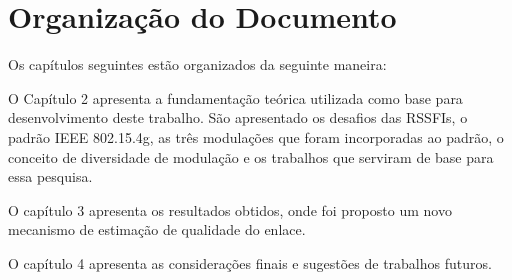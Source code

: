 \section{Organização do Documento}
\label{sec:organizacao}

Os capítulos seguintes estão organizados da seguinte maneira:

O Capítulo 2 apresenta a fundamentação teórica utilizada 
como base para desenvolvimento deste trabalho. São apresentado 
os desafios das RSSFIs, o padrão IEEE 802.15.4g, as três modulações que foram incorporadas ao padrão, o conceito de diversidade de modulação e os trabalhos que serviram de base para essa pesquisa.

O capítulo 3 apresenta os resultados obtidos, onde foi proposto um novo mecanismo de estimação de qualidade do enlace. 

O capítulo 4 apresenta as considerações finais e
 sugestões de trabalhos futuros.


